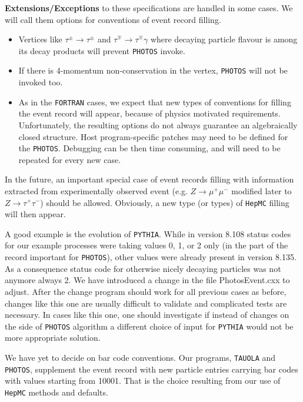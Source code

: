 \documentclass[]{Photos_interface_design}
\begin{document}
\noindent
\textbf{ Extensions/Exceptions} to these specifications are handled in some cases. We will call them
options for conventions of event record filling.
  \begin{itemize} 
    \item  Vertices like $\tau^\pm \rightarrow \tau^\pm$ and $\tau^\mp \rightarrow \tau^\mp \gamma$ 
           where decaying particle flavour is among its decay products will prevent  {\tt PHOTOS} invoke.

    \item  If there is  4-momentum non-conservation in the vertex,
           {\tt PHOTOS} will not be invoked too.

    \item
           As in the {\tt FORTRAN} cases, we expect that  new  types of 
           conventions for filling the event record
           will appear, because of physics motivated requirements.
           Unfortunately, the resulting options do not always guarantee
           an algebraically closed structure.  
           Host program-specific patches may need to be defined for the 
           {\tt PHOTOS}. 
           Debugging can be then  time consuming, and will need to be repeated for every new
           case.
   \end{itemize}


 In the future,  an important special case of event records filling with
information extracted from experimentally observed event (e.g. $Z\to \mu^+\mu^-$
 modified later to $Z\to \tau^+\tau^-$) should be allowed.
  Obviously, a new type (or types) of {\tt HepMC} filling will then appear.

A good example is the evolution of {\tt PYTHIA}. While in version 8.108 status codes for 
our example processes were  taking values 0, 1, or 2  only (in the part of the record 
important for {\tt PHOTOS}), other values were already present in
version 8.135. As a consequence status code for 
otherwise nicely decaying particles was not anymore always 2. We have introduced 
a change  in the file PhotosEvent.cxx to adjust. After  the change
program should work for all previous cases as before, 
changes like this one are usually difficult to validate
and complicated  tests are necessary. In cases like this one, one should  investigate 
if instead of changes on the side of  {\tt PHOTOS} algorithm a different choice of  input for {\tt PYTHIA} would not 
be more appropriate 
solution.

We have yet to decide on bar code conventions. Our programs, {\tt TAUOLA} and
 {\tt PHOTOS}, supplement the event record with new particle entries carrying bar codes 
with values starting from 10001. That is the choice resulting from our use 
of {\tt HepMC} methods and defaults.  
\end{document}
